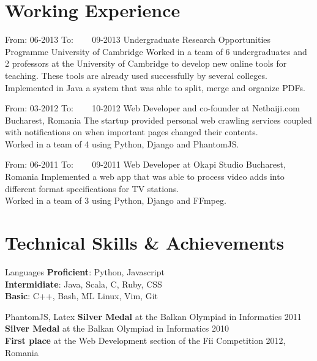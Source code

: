 \documentclass[]{friggeri-cv}
\begin{document}
\section{Working Experience}
\begin{entrylist}

  \entry
  {From: 06-2013} 
  {To: ~~~ 09-2013}
  {Undergraduate Research Opportunities Programme}
  {University of Cambridge}
  {
    Worked in a team of 6 undergraduates and 2 professors at the University of Cambridge to develop new online tools
    for teaching.
    These tools are already used successfully by several colleges.\\

    Implemented in Java a system that was able to split, merge and organize PDFs.
  }

  \entry
  {From: 03-2012}
  {To: ~~~ 10-2012}
  {Web Developer and co-founder at Netbaiji.com}
  {Bucharest, Romania}
  {
    The startup provided personal web crawling services coupled with notifications on when important pages changed
    their contents. \\  

    Worked in a team of 4 using Python, Django and PhantomJS.
  }

  \entry
  {From: 06-2011}
  {To: ~~~ 09-2011}
  {Web Developer at Okapi Studio}
  {Bucharest, Romania}
  {
    Implemented a web app that was able to process video adds into different format specifications for TV stations. \\

    Worked in a team of 3 using Python, Django and FFmpeg.
  }

\end{entrylist}

\section{Technical Skills \& Achievements}
\begin{entrylist}
  \simpleentry
  {Languages}
  {
    \textbf{Proficient}:  Python, Javascript \\
    \textbf{Intermidiate}:  Java, Scala, C, Ruby, CSS \\
    \textbf{Basic}:  C++, Bash, ML
  }
   {
    Linux, Vim, Git
  }

   {
    PhantomJS, Latex
  }
   {
    \textbf{Silver Medal} at the Balkan Olympiad in Informatics 2011 \\
    \textbf{Silver Medal} at the Balkan Olympiad in Informatics 2010 \\
    \textbf{First place} at the Web Development section of the Fii Competition 2012, Romania
  }
\end{entrylist}
\end{document}
